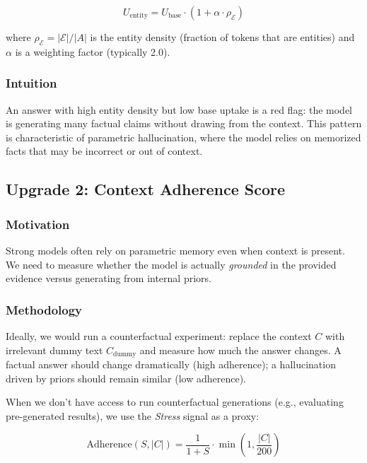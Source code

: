 \begin{equation}
    U_{\text{entity}} = U_{\text{base}} \cdot \left(1 + \alpha \cdot \rho_{\mathcal{E}}\right)
\end{equation}

where $\rho_{\mathcal{E}} = |\mathcal{E}| / |A|$ is the entity density (fraction of tokens that are entities) and $\alpha$ is a weighting factor (typically 2.0).

\subsubsection{Intuition}
An answer with high entity density but low base uptake is a red flag: the model is generating many factual claims without drawing from the context. This pattern is characteristic of parametric hallucination, where the model relies on memorized facts that may be incorrect or out of context.

\subsection{Upgrade 2: Context Adherence Score}

\subsubsection{Motivation}
Strong models often rely on parametric memory even when context is present. We need to measure whether the model is actually \textit{grounded} in the provided evidence versus generating from internal priors.

\subsubsection{Methodology}
Ideally, we would run a counterfactual experiment: replace the context $C$ with irrelevant dummy text $C_{\text{dummy}}$ and measure how much the answer changes. A factual answer should change dramatically (high adherence); a hallucination driven by priors should remain similar (low adherence).

When we don't have access to run counterfactual generations (e.g., evaluating pre-generated results), we use the \textit{Stress} signal as a proxy:

\begin{equation}
    \text{Adherence}(S, |C|) = \frac{1}{1 + S} \cdot \min\left(1, \frac{|C|}{200}\right)
\end{equation}

